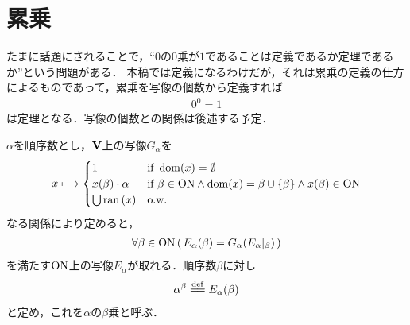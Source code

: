 \section{累乗}
	たまに話題にされることで，``$0$の$0$乗が$1$であることは定義であるか定理であるか''という問題がある．
	本稿では定義になるわけだが，それは累乗の定義の仕方によるものであって，累乗を写像の個数から定義すれば
	\begin{align}
		0^0 = 1
	\end{align}
	は定理となる．写像の個数との関係は後述する予定．
	
	\begin{screen}
		\begin{dfn}[順序数の累乗]
			$\alpha$を順序数とし，$\mathbf{V}$上の写像$G_\alpha$を
			\begin{align}
				x \longmapsto 
				\begin{cases}
					1 & \mbox{if } \operatorname{dom}(x) = \emptyset \\
					x(\beta) \cdot \alpha & \mbox{if } \beta \in \mathrm{ON} \wedge \operatorname{dom}(x) = \beta \cup \{\beta\} 
					\wedge x(\beta) \in \mathrm{ON} \\
					\bigcup \operatorname*{ran} \left(x\right) & \mbox{o.w.}
				\end{cases}
			\end{align}
			なる関係により定めると，
			\begin{align}
				\forall \beta \in \mathrm{ON}\, (\, E_\alpha(\beta) = G_\alpha(E_\alpha|_\beta)\, )
			\end{align}
			を満たす$\mathrm{ON}$上の写像$E_\alpha$が取れる．順序数$\beta$に対し
			\begin{align}
				\alpha^\beta \defeq E_\alpha(\beta)
			\end{align}
			と定め，これを$\alpha$の$\beta$乗と呼ぶ．
		\end{dfn}
	\end{screen}
	
